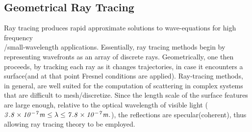 \documentclass[times, 10pt,a4paper]{article}
\begin{document}
\subsection{Geometrical Ray Tracing}
Ray tracing produces rapid approximate solutions to wave-equations for high frequency \\/small-wavelength applications. Essentially,
ray tracing methods begin by representing wavefronts as an array of discrete rays. Geometrically, one then proceeds, by tracking each ray 
as it changes trajectories, in case it encounters a surface(and at that point Fresnel conditions are applied). Ray-tracing methods, in general, 
are well suited for the computation of scattering in complex systems that are difficult to mesh/discretize. 
Since the length scale of the surface features are large enough, relative to the optical wavelength of visible light ($\it 3.8\times 10^{-7}m 
\le \lambda \le 7.8\times 10^{-7}m.$), the reflections are specular(coherent), thus allowing ray tracing theory to be employed.\\
%
%
\end{document}
